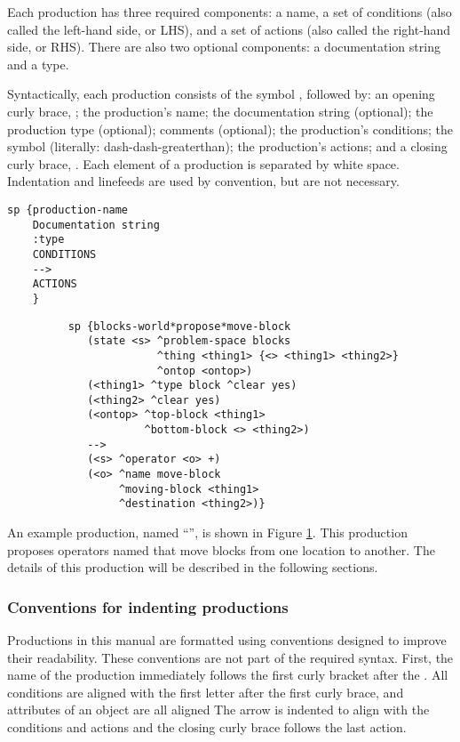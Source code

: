 Each production has three required components: a name, a set of conditions (also called the left-hand side, or LHS), and a set of actions (also called the right-hand side, or RHS).  There are also two optional components: a documentation string and a type.

Syntactically, each production consists of the symbol , followed by: an opening curly brace, \soar{\{}; the production's name; the documentation string (optional); the production type (optional); comments (optional); the production's conditions; the symbol \soar{-->} (literally: dash-dash-greaterthan); the production's actions; and a closing curly brace, \soar{\}}.  Each element of a production is separated by white space. Indentation and linefeeds are used by convention, but are not necessary.

\begin{verbatim}
sp {production-name
    Documentation string
    :type
    CONDITIONS
    -->
    ACTIONS
    }
\end{verbatim}
\vspace{12pt}

\begin{figure}
	\begin{verbatim}
	sp {blocks-world*propose*move-block
	   (state <s> ^problem-space blocks
	              ^thing <thing1> {<> <thing1> <thing2>}
	              ^ontop <ontop>)
	   (<thing1> ^type block ^clear yes)
	   (<thing2> ^clear yes)
	   (<ontop> ^top-block <thing1>
	            ^bottom-block <> <thing2>)
	   -->
	   (<s> ^operator <o> +)
	   (<o> ^name move-block 
	        ^moving-block <thing1> 
	        ^destination <thing2>)}
	\end{verbatim}
	\label{fig:ex-prod}
\end{figure}

An example production, named ``'', is shown in Figure \ref{fig:ex-prod}. This production proposes operators named  that move blocks from one location to another. The details of this production will be described in the following sections.

\subsubsection*{Conventions for indenting productions}

Productions in this manual are formatted using conventions designed to improve their readability. These conventions are not part of the required syntax. First, the name of the production immediately follows the first curly bracket after the .  All conditions are aligned with the first letter after the first curly brace, and attributes of an object are all aligned The arrow is indented to align with the conditions and actions and the closing curly brace follows the last action.

